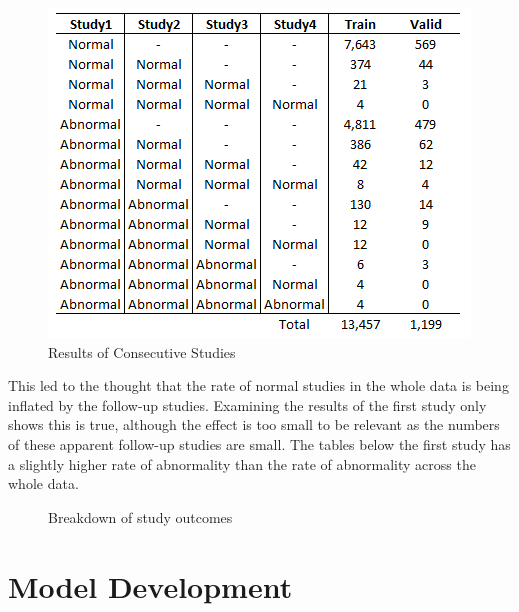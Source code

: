 \documentclass[11pt]{article} %
\theoremstyle{plain}
\theoremstyle{definition}
\begin{document}
\begin{figure}[!ht]
    \centering    
    \caption{Results of Consecutive Studies}
    \label{fig:ConsecutiveStudyResults}
    \includegraphics[scale=0.7]{MURA-Breakdowns/ConsecutiveStudyResults.PNG}
\end{figure}
\FloatBarrier
\noindent
This led to the thought that the rate of normal studies in the whole data is being inflated by the follow-up studies. Examining the results of the first study only shows this is true, although the effect is too small to be relevant as the numbers of these apparent follow-up studies are small. The tables below the first study has a slightly higher rate of abnormality than the rate of abnormality across the whole data.
\begin{figure}[!ht]
\centering
{}
\caption{Breakdown of study outcomes}
\label{fig:Outcomes_Breakdown}
\end{figure}
\FloatBarrier



\newpage
\section{Model Development}
\end{document}
